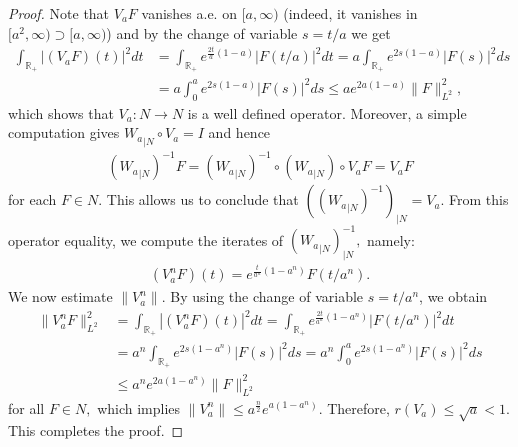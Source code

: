 \documentclass[11pt]{amsart}
\theoremstyle{plain}
\theoremstyle{remark}
\theoremstyle{plain}
\begin{document}
\begin{proof}

Note that $V_aF$ vanishes a.e. on $[a,\infty)$ (indeed, it vanishes in $[a^2, \infty) \supset [a, \infty)$) and  by the change of variable $s=t/a$ we get  
\begin{align*}
\int_{\mathbb{R}_+}|(V_aF)(t)|^2dt&=\int_{\mathbb{R}_+}e^{\frac{2t}{a}(1-a)}|F(t/a)|^2dt=a\int_{\mathbb{R}_+}e^{2s(1 - a)}|F(s)|^2ds\\
&= a\int_{0}^{a} e^{2s(1-a)}|F(s)|^2ds\leq ae^{2a(1-a)}\|F\|^2_{L^2},
\end{align*}
which shows that $V_a: N \to N$ is a well defined operator. Moreover, a simple computation gives ${W_a}_{|N} \circ V_a=I$  and hence 
\begin{align*}
({W_a}_{|N})^{-1}F=({W_a}_{|N})^{-1}\circ({W_a}_{|N}) \circ V_aF = V_aF
\end{align*}
for each $F\in N.$ This allows us to conclude that $\left( ({W_a}_{|N})^{-1} \right)_{|N}=V_a.$ From this operator equality, we compute the iterates of $({W_a}_{|N})^{-1}_{|N},$ namely:
\begin{align*}
(V_a^nF)(t)=e^{\frac{t}{a^n}(1-a^n)}F(t/a^n).
\end{align*}
We now estimate $\|V_a^n\|.$ By using the change of variable $s=t/a^n$, we obtain
\begin{align*}
\|V_a^nF\|^2_{L^2}&=\int_{\mathbb{R}_+}|(V_a^nF)(t)|^2dt=\int_{\mathbb{R}_+}e^{\frac{2t}{a^n}(1-a^n)}|F(t/a^n)|^2dt\\
&=a^n\int_{\mathbb{R}_+}e^{2s(1-a^n)}|F(s)|^2ds=a^n\int_{0}^ae^{2s(1-a^n)}|F(s)|^2ds\\
&\leq a^ne^{2a(1-a^n)}\|F\|^2_{L^2}
\end{align*}
for all $F\in N,$ which implies $\|V_a^n\|\leq a^{\frac{n}{2}}e^{a(1-a^n)}.$ Therefore, $r(V_a) \leq \sqrt{a}<1.$ This completes the proof.
\end{proof}
\end{document}
